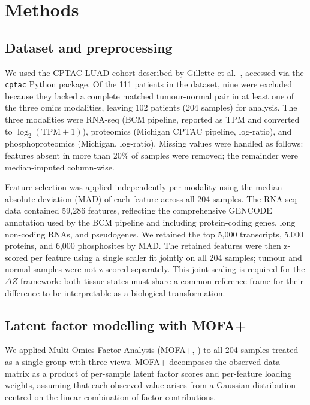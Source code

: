 \section{Methods}
\label{sec:methods}

\subsection{Dataset and preprocessing}

We used the CPTAC-LUAD cohort described by Gillette et al.\ \cite{gillette2020proteogenomic},
accessed via the \texttt{cptac} Python package.
Of the 111 patients in the dataset, nine were excluded because they lacked a complete
matched tumour-normal pair in at least one of the three omics modalities, leaving 102 patients
(204 samples) for analysis.
The three modalities were RNA-seq (BCM pipeline, reported as TPM and converted to
$\log_2(\text{TPM}+1)$), proteomics (Michigan CPTAC pipeline, log-ratio), and
phosphoproteomics (Michigan, log-ratio).
Missing values were handled as follows: features absent in more than 20\% of samples were
removed; the remainder were median-imputed column-wise.

Feature selection was applied independently per modality using the median absolute
deviation (MAD) of each feature across all 204 samples.
The RNA-seq data contained 59,286 features, reflecting the comprehensive GENCODE annotation
used by the BCM pipeline and including protein-coding genes, long non-coding RNAs,
and pseudogenes.
We retained the top 5,000 transcripts, 5,000 proteins, and 6,000 phosphosites by MAD.
The retained features were then z-scored per feature using a single scaler fit jointly on
all 204 samples; tumour and normal samples were not z-scored separately.
This joint scaling is required for the $\Delta Z$ framework: both tissue states must share
a common reference frame for their difference to be interpretable as a biological
transformation.

\subsection{Latent factor modelling with MOFA+}

We applied Multi-Omics Factor Analysis (MOFA+, \cite{argelaguet2020mofa2}) to all 204
samples treated as a single group with three views.
MOFA+ decomposes the observed data matrix as a product of per-sample latent factor scores
and per-feature loading weights, assuming that each observed value arises from a
Gaussian distribution centred on the linear combination of factor contributions.

